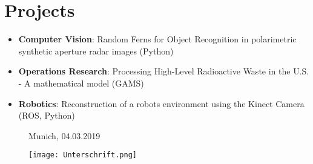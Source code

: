 \documentclass[letterpaper,11pt]{article}
\newcommand{\resumeItem}[2]{
  \item\small{
    {#1}{:#2 \vspace{-2pt}}
  }
}
\newcommand{\resumeSubItem}[2]{\resumeItem{#1}{#2}\vspace{-4pt}}
\newcommand{\resumeSubHeadingListStart}{\begin{itemize}[leftmargin=*]}
\newcommand{\resumeSubHeadingListEnd}{\end{itemize}}
\begin{document}
\section{Projects}
  \resumeSubHeadingListStart
  	\item{\textbf{Computer Vision}: Random Ferns for Object Recognition in polarimetric synthetic aperture radar images (Python)}
  	\vspace{-0.1in}
    \item{\textbf{Operations Research}: Processing High-Level Radioactive Waste in the U.S. - A mathematical model (GAMS)}   
    \vspace{-0.1in} 	
	\item{\textbf{Robotics}: Reconstruction of a robots environment using the Kinect Camera (ROS, Python)}
	\vspace{-0.1in}
\resumeSubHeadingListEnd







\vspace{0.5pt}		
\begin{figure}[h]
	\centering	
	\begin{minipage}{0.49\textwidth}
		Munich, 04.03.2019
				
	\end{minipage}		
	\begin{minipage}{0.49\textwidth}
		\raggedright
		\texttt{[image: Unterschrift.png]}
	\end{minipage}	
\end{figure}

\end{document}
